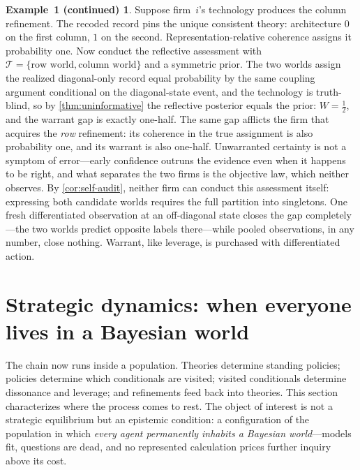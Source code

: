 \documentclass[11pt]{article}
\theoremstyle{definition}
\newtheorem*{excont}{Example~1 (continued)}
\begin{document}
\begin{excont}
Suppose firm~$i$'s technology produces the column refinement.
The recoded record pins the unique consistent theory: architecture $0$ on the first column, $1$ on the second.
Representation-relative coherence assigns it probability one.
Now conduct the reflective assessment with $\mathcal T=\{\text{row world},\text{column world}\}$ and a symmetric prior.
The two worlds assign the realized diagonal-only record equal probability by the same coupling argument conditional on the diagonal-state event, and the technology is truth-blind, so by \cref{thm:uninformative} the reflective posterior equals the prior: $W=\tfrac12$, and the warrant gap is exactly one-half.
The same gap afflicts the firm that acquires the \emph{row} refinement: its coherence in the true assignment is also probability one, and its warrant is also one-half.
Unwarranted certainty is not a symptom of error---early confidence outruns the evidence even when it happens to be right, and what separates the two firms is the objective law, which neither observes.
By \cref{cor:self-audit}, neither firm can conduct this assessment itself: expressing both candidate worlds requires the full partition into singletons.
One fresh differentiated observation at an off-diagonal state closes the gap completely---the two worlds predict opposite labels there---while pooled observations, in any number, close nothing.
Warrant, like leverage, is purchased with differentiated action.
\end{excont}
\section{Strategic dynamics: when everyone lives in a Bayesian world}
\label{sec:dynamics}

The chain now runs inside a population.
Theories determine standing policies; policies determine which conditionals are visited; visited conditionals determine dissonance and leverage; and refinements feed back into theories.
This section characterizes where the process comes to rest.
The object of interest is not a strategic equilibrium but an epistemic condition: a configuration of the population in which \emph{every agent permanently inhabits a Bayesian world}---models fit, questions are dead, and no represented calculation prices further inquiry above its cost.
\end{document}
